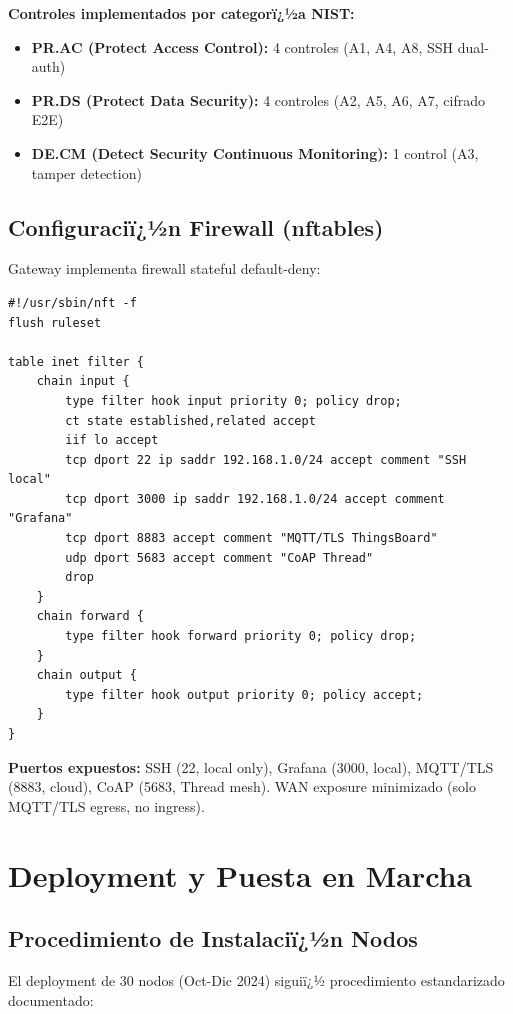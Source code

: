 \textbf{Controles implementados por categorï¿½a NIST:}

\begin{itemize}
    \item \textbf{PR.AC (Protect Access Control):} 4 controles (A1, A4, A8, SSH dual-auth)
    \item \textbf{PR.DS (Protect Data Security):} 4 controles (A2, A5, A6, A7, cifrado E2E)
    \item \textbf{DE.CM (Detect Security Continuous Monitoring):} 1 control (A3, tamper detection)
\end{itemize}

\subsection{Configuraciï¿½n Firewall (nftables)}
\label{sec:impl-firewall}

Gateway implementa firewall stateful default-deny:

\begin{verbatim}
#!/usr/sbin/nft -f
flush ruleset

table inet filter {
    chain input {
        type filter hook input priority 0; policy drop;
        ct state established,related accept
        iif lo accept
        tcp dport 22 ip saddr 192.168.1.0/24 accept comment "SSH local"
        tcp dport 3000 ip saddr 192.168.1.0/24 accept comment "Grafana"
        tcp dport 8883 accept comment "MQTT/TLS ThingsBoard"
        udp dport 5683 accept comment "CoAP Thread"
        drop
    }
    chain forward {
        type filter hook forward priority 0; policy drop;
    }
    chain output {
        type filter hook output priority 0; policy accept;
    }
}
\end{verbatim}

\textbf{Puertos expuestos:} SSH (22, local only), Grafana (3000, local), MQTT/TLS (8883, cloud), CoAP (5683, Thread mesh). WAN exposure minimizado (solo MQTT/TLS egress, no ingress).

\section{Deployment y Puesta en Marcha}
\label{sec:impl-deployment}

\subsection{Procedimiento de Instalaciï¿½n Nodos}

El deployment de 30 nodos (Oct-Dic 2024) siguiï¿½ procedimiento estandarizado documentado:

